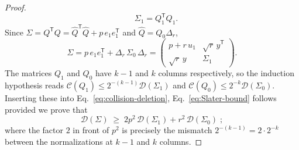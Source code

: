 \documentclass[aps,prl,twocolumn,superscriptaddress,reprint,longbibliography,nofootinbib]{revtex4-2}
\newcommand{\trans}{\mathsf{T}}
\begin{document}
\begin{proof}
\begin{equation}
    \quad \Sigma_1=Q_1^{\trans}Q_1 .\end{equation}
Since $\Sigma=Q^{\trans}Q=\widehat Q^{\trans}\widehat Q+p\,e_1e_1^{\trans}$ and $\widehat Q=Q_0\Delta_r$,
\begin{equation}\Sigma=p\,e_1e_1^{\trans}+\Delta_r\,\Sigma_0\,\Delta_r
    =\begin{pmatrix} p+r\,u_1 & \sqrt r\,y^{\trans}\\[2pt] \sqrt r\,y & \Sigma_1\end{pmatrix}.
    \label{eq:S-deletion}
\end{equation} 
The matrices $Q_1$ and $Q_0$ have $k-1$ and $k$ columns respectively, so the induction hypothesis reads $\mathcal{C}(Q_1)\le 2^{-(k-1)}\mathcal{D}(\Sigma_1)$ and $\mathcal{C}(Q_0)\le 2^{-k}\mathcal{D}(\Sigma_0)$. Inserting these into Eq.~\eqref{eq:collision-deletion}, Eq.~\eqref{eq:Slater-bound} follows provided we prove that
\begin{equation}
    \mathcal{D}(\Sigma)\;\ge\;2p^2\,\mathcal{D}(\Sigma_1)+r^2\,\mathcal{D}(\Sigma_0)\;;
    \label{eq:determinant-deletion}
\end{equation}
where the factor $2$ in front of $p^2$ is precisely the mismatch $2^{-(k-1)}=2\cdot 2^{-k}$ between the normalizations at $k-1$ and $k$ columns.


\end{proof}
\end{document}
